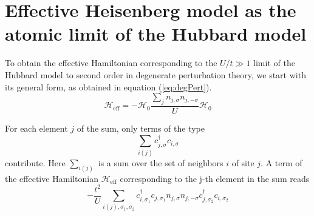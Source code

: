 \section{Effective Heisenberg model as the atomic limit of the Hubbard model}
\label{sec:heisenberg}

To obtain the effective Hamiltonian corresponding to the $U/t \gg 1$ limit of the Hubbard model to second order in degenerate perturbation theory, we start with its general form, as obtained in equation (\ref{eq:degPert}).
\begin{equation}
\mathcal{H}_{\text{eff}} = - \mathcal{H}_0 \frac{\sum_j n_{j,\sigma} n_{j, -\sigma}}{U} \mathcal{H}_0
\end{equation}

For each element $j$ of the sum, only terms of the type 
\begin{equation*}
\sum_{i(j)} c_{j,\sigma}^\dagger c_{i,\sigma} 
\end{equation*}
contribute.
Here $\sum_{i(j)}$ is a sum over the set of neighbors $i$ of site $j$.
A term of the effective Hamiltonian $\mathcal{H}_{\text{eff}}$ corresponding to the j-th element in the sum reads
\begin{equation*}
-\frac{t^2}{U} \sum_{i(j), \sigma_1, \sigma_2 } c_{i,\sigma_1}^\dagger c_{j,\sigma_1} n_{j,\sigma} n_{j, -\sigma} c_{j, \sigma_2}^\dagger c_{i, \sigma_2}
\end{equation*}

